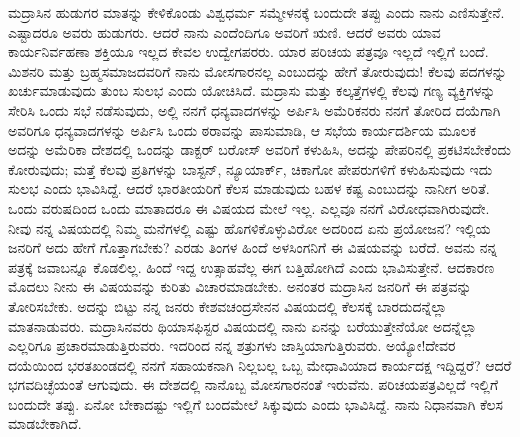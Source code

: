 ಮದ್ರಾಸಿನ ಹುಡುಗರ ಮಾತನ್ನು ಕೇಳಿಕೊಂಡು ವಿಶ್ವಧರ್ಮ ಸಮ್ಮೇಳನಕ್ಕೆ ಬಂದುದೇ ತಪ್ಪು ಎಂದು ನಾನು ಎಣಿಸುತ್ತೇನೆ. ಎಷ್ಟಾದರೂ ಅವರು ಹುಡುಗರು. ಆದರೆ ನಾನು ಎಂದೆಂದಿಗೂ ಅವರಿಗೆ ಋಣಿ. ಆದರೆ ಅವರು ಯಾವ ಕಾರ್ಯನಿರ್ವಹಣಾ ಶಕ್ತಿಯೂ ಇಲ್ಲದ ಕೇವಲ ಉದ್ವೇಗಪರರು. ಯಾರ ಪರಿಚಯ ಪತ್ರವೂ ಇಲ್ಲದೆ ಇಲ್ಲಿಗೆ ಬಂದೆ. ಮಿಶನರಿ ಮತ್ತು ಬ್ರಹ್ಮಸಮಾಜದವರಿಗೆ ನಾನು ಮೋಸಗಾರನಲ್ಲ ಎಂಬುದನ್ನು ಹೇಗೆ ತೋರುವುದು! ಕೆಲವು ಪದಗಳನ್ನು ಖರ್ಚುಮಾಡುವುದು ತುಂಬ ಸುಲಭ ಎಂದು ಯೋಚಿಸಿದೆ. ಮದ್ರಾಸು ಮತ್ತು ಕಲ್ಕತ್ತೆಗಳಲ್ಲಿ ಕೆಲವು ಗಣ್ಯ ವ್ಯಕ್ತಿಗಳನ್ನು ಸೇರಿಸಿ ಒಂದು ಸಭೆ ನಡೆಸುವುದು, ಅಲ್ಲಿ ನನಗೆ ಧನ್ಯವಾದಗಳನ್ನು ಅರ್ಪಿಸಿ ಅಮೆರಿಕನರು ನನಗೆ ತೋರಿದ ದಯೆಗಾಗಿ ಅವರಿಗೂ ಧನ್ಯವಾದಗಳನ್ನು ಅರ್ಪಿಸಿ ಒಂದು ಠರಾವನ್ನು ಪಾಸುಮಾಡಿ, ಆ ಸಭೆಯ ಕಾರ್ಯದರ್ಶಿಯ ಮೂಲಕ ಅದನ್ನು ಅಮೆರಿಕಾ ದೇಶದಲ್ಲಿ ಒಂದನ್ನು ಡಾಕ್ಟರ್ ಬರೋಸ್ ಅವರಿಗೆ ಕಳುಹಿಸಿ, ಅದನ್ನು ಪೇಪರಿನಲ್ಲಿ ಪ್ರಕಟಿಸಬೇಕೆಂದು ಕೋರುವುದು; ಮತ್ತೆ ಕೆಲವು ಪ್ರತಿಗಳನ್ನು ಬಾಸ್ಟನ್, ನ್ಯೂಯಾರ್ಕ್, ಚಿಕಾಗೋ ಪೇಪರುಗಳಿಗೆ ಕಳುಹಿಸುವುದು \enginline{-} ಇದು ಸುಲಭ ಎಂದು ಭಾವಿಸಿದ್ದೆ. ಆದರೆ ಭಾರತೀಯರಿಗೆ ಕೆಲಸ ಮಾಡುವುದು ಬಹಳ ಕಷ್ಟ ಎಂಬುದನ್ನು ನಾನೀಗ ಅರಿತೆ. ಒಂದು ವರುಷದಿಂದ ಒಂದು ಮಾತಾದರೂ ಈ ವಿಷಯದ ಮೇಲೆ ಇಲ್ಲ. ಎಲ್ಲವೂ ನನಗೆ ವಿರೋಧವಾಗಿರುವುದೇ. ನೀವು ನನ್ನ ವಿಷಯದಲ್ಲಿ ನಿಮ್ಮ ಮನೆಗಳಲ್ಲಿ ಎಷ್ಟು ಹೊಗಳಿಕೊಳ್ಳುವಿರೋ ಅದರಿಂದ ಏನು ಪ್ರಯೋಜನ? ಇಲ್ಲಿಯ ಜನರಿಗೆ ಅದು ಹೇಗೆ ಗೊತ್ತಾಗಬೇಕು? ಎರಡು ತಿಂಗಳ ಹಿಂದೆ ಅಳಸಿಂಗನಿಗೆ ಈ ವಿಷಯವನ್ನು ಬರೆದೆ. ಅವನು ನನ್ನ ಪತ್ರಕ್ಕೆ ಜವಾಬನ್ನೂ ಕೊಡಲಿಲ್ಲ. ಹಿಂದೆ ಇದ್ದ ಉತ್ಸಾಹವೆಲ್ಲ ಈಗ ಬತ್ತಿಹೋಗಿದೆ ಎಂದು ಭಾವಿಸುತ್ತೇನೆ. ಆದಕಾರಣ ಮೊದಲು ನೀನು ಈ ವಿಷಯವನ್ನು ಕುರಿತು ವಿಚಾರಮಾಡಬೇಕು. ಅನಂತರ ಮದ್ರಾಸಿನ ಜನರಿಗೆ ಈ ಪತ್ರವನ್ನು ತೋರಿಸಬೇಕು. ಅದನ್ನು ಬಿಟ್ಟು ನನ್ನ ಜನರು ಕೇಶವಚಂದ್ರಸೇನನ ವಿಷಯದಲ್ಲಿ ಕೆಲಸಕ್ಕೆ ಬಾರದುದನ್ನೆಲ್ಲಾ ಮಾತನಾಡುವರು. ಮದ್ರಾಸಿನವರು ಥಿಯಾಸಫಿಸ್ಟರ ವಿಷಯದಲ್ಲಿ ನಾನು ಏನನ್ನು ಬರೆಯುತ್ತೇನೆಯೋ ಅದನ್ನೆಲ್ಲಾ ಎಲ್ಲರಿಗೂ ಪ್ರಚಾರಮಾಡುತ್ತಿರುವರು. ಇದರಿಂದ ನನ್ನ ಶತ್ರುಗಳು ಜಾಸ್ತಿಯಾಗುತ್ತಿರುವರು. ಅಯ್ಯೋ!ದೇವರ ದಯೆಯಿಂದ ಭರತಖಂಡದಲ್ಲಿ ನನಗೆ ಸಹಾಯಕನಾಗಿ ನಿಲ್ಲಬಲ್ಲ ಒಬ್ಬ ಮೇಧಾವಿಯಾದ ಕಾರ್ಯದಕ್ಷ ಇದ್ದಿದ್ದರೆ? ಆದರೆ ಭಗವದಿಚ್ಛೆಯಂತೆ ಆಗುವುದು. ಈ ದೇಶದಲ್ಲಿ ನಾನೊಬ್ಬ ಮೋಸಗಾರನಂತೆ ಇರುವೆನು. ಪರಿಚಯಪತ್ರವಿಲ್ಲದೆ ಇಲ್ಲಿಗೆ ಬಂದುದೇ ತಪ್ಪು. ಏನೋ ಬೇಕಾದಷ್ಟು ಇಲ್ಲಿಗೆ ಬಂದಮೇಲೆ ಸಿಕ್ಕುವುದು ಎಂದು ಭಾವಿಸಿದ್ದೆ. ನಾನು ನಿಧಾನವಾಗಿ ಕೆಲಸ ಮಾಡಬೇಕಾಗಿದೆ.
\vspace{0.3cm}

